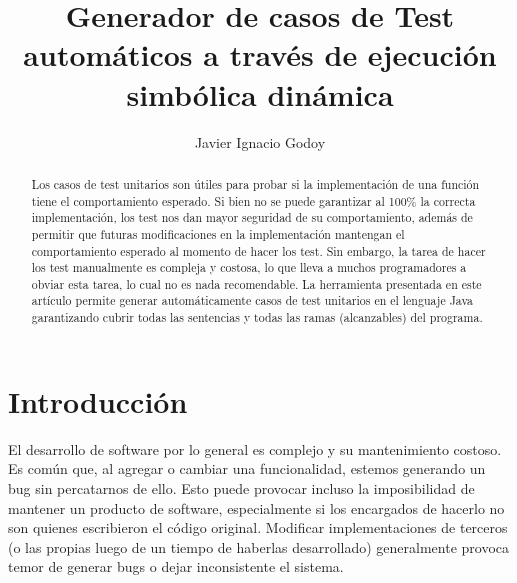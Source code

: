 \documentclass{llncs}
\title{Generador de casos de Test automáticos a través de ejecución simbólica dinámica}
\author{Javier Ignacio Godoy \\ \href{mailto:\mailPersonal}{\mailPersonal} }
\institute{Instituto de Industria, Universidad Nacional de General Sarmiento, Buenos Aires, Argentina}
\begin{document}
\maketitle

\begin{abstract}
Los casos de test unitarios son útiles para probar si la implementación de una función tiene el comportamiento esperado.
Si bien no se puede garantizar al 100\% la correcta implementación, los test nos dan mayor seguridad de su comportamiento,
además de permitir que futuras modificaciones en la implementación mantengan el comportamiento esperado al momento de hacer los test.
Sin embargo, la tarea de hacer los test manualmente es compleja y costosa, lo que lleva a muchos programadores a obviar esta tarea,
lo cual no es nada recomendable. La herramienta presentada en este artículo permite generar automáticamente casos de test unitarios
en el lenguaje Java garantizando cubrir todas las sentencias y todas las ramas (alcanzables) del programa.
\end{abstract}



\section{Introducción}
El desarrollo de software por lo general es complejo y su mantenimiento costoso. Es común que, al agregar o cambiar una funcionalidad, estemos generando un bug sin percatarnos de ello.
Esto puede provocar incluso la imposibilidad de mantener un producto de software, especialmente si los encargados de hacerlo no son quienes escribieron el código original.
Modificar implementaciones de terceros (o las propias luego de un tiempo de haberlas desarrollado) generalmente provoca temor de generar bugs o dejar inconsistente el sistema. 
\end{document}
